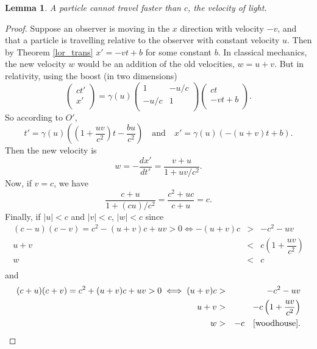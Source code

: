 \documentclass[12pt]{article}
\newtheorem{lem}{Lemma}
\theoremstyle{defn}
\theoremstyle{pf}
\newcommand{\0}{\emptyset}
\renewcommand{\-}{\setminus}
\begin{document}
\begin{lem}\label{c}A particle cannot travel faster than $c$, the velocity of light.\end{lem}
\begin{proof}Suppose an observer is moving in the $x$ direction with velocity $-v$, and that a particle is travelling relative to the observer with constant velocity $u$. Then by Theorem \ref{lor_trans} $x'=-vt+b$ for some constant $b$. In classical mechanics, the new velocity $w$ would be an addition of the old velocities, $w=u+v$. But in relativity, using the boost (in two dimensions) $$\left(\begin{array}{c}ct'\\
                                                                                                                                                                                                         x'\\
\end{array}\right)=\gamma(u)\left(\begin{array}{cc}1 & -u/c\\
                                   -u/c & 1\\
                                  \end{array}\right)\left(\begin{array}{c}ct\\
                                                                                                                                                                                                          -vt+b\\
\end{array}\right).$$ So according to $O'$, $$t'=\gamma(u)\left(\left(1+\dfrac{uv}{c^2}\right)t-\dfrac{bu}{c^2}\right) \quad \mbox{and} \quad x'=\gamma(u)\left(-\left(u+v\right)t+b\right).$$ Then the new velocity is $$w=-\dfrac{dx'}{dt'}=\dfrac{v+u}{1+uv/c^2}.$$ Now, if $v=c$, we have
$$\dfrac{c+u}{1+(cu)/c^2}= \dfrac{c^2+uc}{c+u}=c.$$ Finally, if $|u|<c$ and $|v|<c$, $|w|<c$ since
\begin{eqnarray*}(c-u)(c-v)=c^2-(u+v)c+uv>0\iff -(u+v)c&>&-c^2-uv\\
 u+v&<&c\left(1+\dfrac{uv}{c^2}\right)\\
w&<&c\\
\end{eqnarray*} and
\begin{eqnarray*}(c+u)(c+v)=c^2+(u+v)c+uv>0\iff (u+v)c&>&-c^2-uv\\
 u+v&>&-c\left(1+\dfrac{uv}{c^2}\right)\\
w&>&-c \quad \mbox{\cite{woodhouse}}.\\
\end{eqnarray*}
\end{proof}
\end{document}
